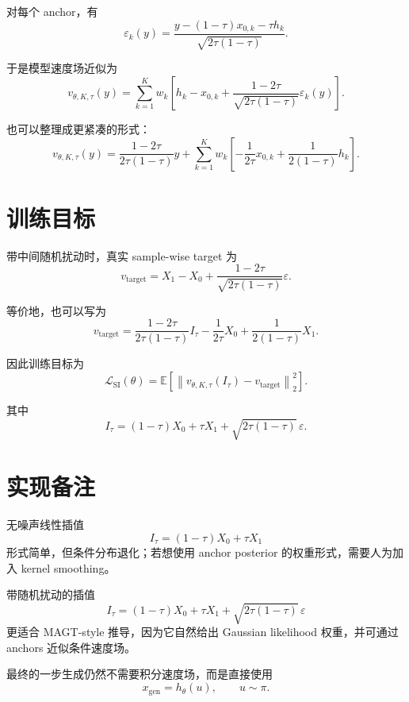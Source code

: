 \documentclass[UTF8,11pt]{ctexart}
\newcommand{\E}{\mathbb{E}}
\begin{document}
对每个 anchor，有
\begin{equation}
\varepsilon_k(y)
=
\frac{
y-(1-\tau)x_{0,k}-\tau h_k
}{
\sqrt{2\tau(1-\tau)}
}.
\end{equation}

于是模型速度场近似为
\begin{equation}
v_{\theta,K,\tau}(y)
=
\sum_{k=1}^{K}
w_k
\left[
h_k-x_{0,k}
+
\frac{1-2\tau}
{\sqrt{2\tau(1-\tau)}}
\varepsilon_k(y)
\right].
\end{equation}

也可以整理成更紧凑的形式：
\begin{equation}
v_{\theta,K,\tau}(y)
=
\frac{1-2\tau}
{2\tau(1-\tau)}y
+
\sum_{k=1}^{K}
w_k
\left[
-
\frac{1}{2\tau}x_{0,k}
+
\frac{1}{2(1-\tau)}h_k
\right].
\end{equation}

\section{训练目标}

带中间随机扰动时，真实 sample-wise target 为
\begin{equation}
v_{\mathrm{target}}
=
X_1-X_0
+
\frac{1-2\tau}
{\sqrt{2\tau(1-\tau)}}\varepsilon.
\end{equation}

等价地，也可以写为
\begin{equation}
v_{\mathrm{target}}
=
\frac{1-2\tau}
{2\tau(1-\tau)}I_\tau
-
\frac{1}{2\tau}X_0
+
\frac{1}{2(1-\tau)}X_1.
\end{equation}

因此训练目标为
\begin{equation}
\mathcal{L}_{\mathrm{SI}}(\theta)
=
\E
\left[
\left\|
v_{\theta,K,\tau}(I_\tau)
-
v_{\mathrm{target}}
\right\|_2^2
\right].
\end{equation}

其中
\begin{equation}
I_\tau
=
(1-\tau)X_0
+
\tau X_1
+
\sqrt{2\tau(1-\tau)}\,\varepsilon.
\end{equation}

\section{实现备注}

无噪声线性插值
\[
I_\tau=(1-\tau)X_0+\tau X_1
\]
形式简单，但条件分布退化；若想使用 anchor posterior 的权重形式，需要人为加入 kernel smoothing。

带随机扰动的插值
\[
I_\tau=(1-\tau)X_0+\tau X_1+\sqrt{2\tau(1-\tau)}\,\varepsilon
\]
更适合 MAGT-style 推导，因为它自然给出 Gaussian likelihood 权重，并可通过 anchors 近似条件速度场。

最终的一步生成仍然不需要积分速度场，而是直接使用
\begin{equation}
x_{\mathrm{gen}}=h_\theta(u),
\qquad
u\sim\pi.
\end{equation}
\end{document}

